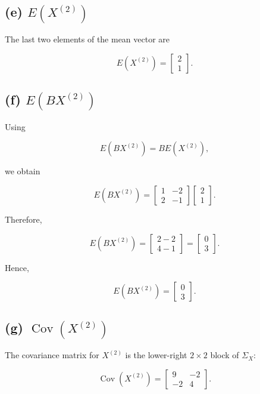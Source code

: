 \documentclass[12pt]{article}
\begin{document}
\subsection*{(e) $E(X^{(2)})$}

The last two elements of the mean vector are

\[
\boxed{
E(X^{(2)})
=
\begin{bmatrix}
2\\
1
\end{bmatrix}
}.
\]

\subsection*{(f) $E(BX^{(2)})$}

Using

\[
E(BX^{(2)})=BE(X^{(2)}),
\]

we obtain

\[
E(BX^{(2)})
=
\begin{bmatrix}
1&-2\\
2&-1
\end{bmatrix}
\begin{bmatrix}
2\\
1
\end{bmatrix}.
\]

Therefore,

\[
E(BX^{(2)})
=
\begin{bmatrix}
2-2\\
4-1
\end{bmatrix}
=
\begin{bmatrix}
0\\
3
\end{bmatrix}.
\]

Hence,

\[
\boxed{
E(BX^{(2)})
=
\begin{bmatrix}
0\\
3
\end{bmatrix}
}.
\]

\subsection*{(g) $\operatorname{Cov}(X^{(2)})$}

The covariance matrix for $X^{(2)}$ is the lower-right $2\times2$ block of $\Sigma_X$:

\[
\boxed{
\operatorname{Cov}(X^{(2)})
=
\begin{bmatrix}
9&-2\\
-2&4
\end{bmatrix}
}.
\]
\end{document}

